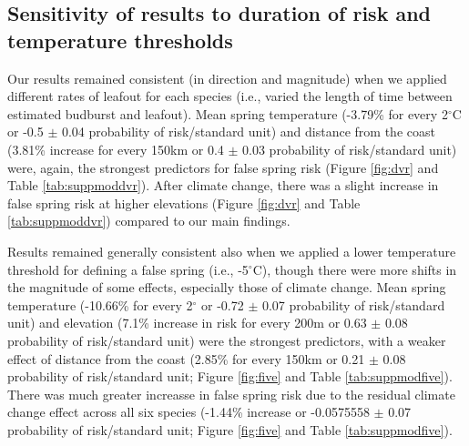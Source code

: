 \documentclass{article}\usepackage[]{graphicx}\usepackage[]{color}
\begin{document}
\subsection*{Sensitivity of results to duration of risk and temperature thresholds}
Our results remained consistent (in direction and magnitude) when we applied different rates of leafout for each species (i.e., varied the length of time between estimated budburst and leafout). Mean spring temperature (-3.79\% for every 2$^\circ$C or -0.5 $\pm$ 0.04 probability of risk/standard unit) and distance from the coast (3.81\% increase for every 150km or 0.4 $\pm$ 0.03 probability of risk/standard unit) were, again, the strongest predictors for false spring risk (Figure \ref{fig:dvr} and Table \ref{tab:suppmoddvr}). After climate change, there was a slight increase in false spring risk at higher elevations (Figure \ref{fig:dvr} and Table \ref{tab:suppmoddvr}) compared to our main findings. 

Results remained generally consistent also when we applied a lower temperature threshold for defining a false spring (i.e., -5$^{\circ}$C), though there were more shifts in the magnitude of some effects, especially those of climate change. Mean spring temperature (-10.66\% for every 2$^\circ$ or -0.72 $\pm$ 0.07 probability of risk/standard unit) and elevation (7.1\% increase in risk for every 200m or 0.63 $\pm$ 0.08 probability of risk/standard unit) were the strongest predictors, with a weaker effect of distance from the coast (2.85\% for every 150km or 0.21 $\pm$ 0.08 probability of risk/standard unit; Figure \ref{fig:five} and Table \ref{tab:suppmodfive}). There was much greater increasse in false spring risk due to the residual climate change effect across all six species (-1.44\% increase or -0.0575558 $\pm$ 0.07 probability of risk/standard unit; Figure \ref{fig:five} and Table \ref{tab:suppmodfive}). 
\end{document}
